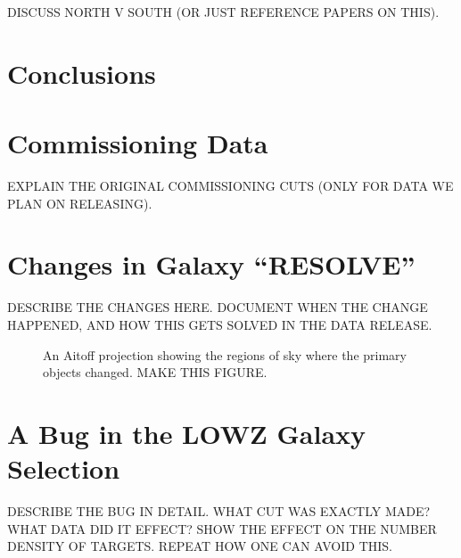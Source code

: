 \documentclass[iop,apj]{emulateapj}
\begin{document}
DISCUSS NORTH V SOUTH (OR JUST REFERENCE PAPERS ON THIS).

\section{Conclusions}


\appendix

\section{Commissioning Data}

EXPLAIN THE ORIGINAL COMMISSIONING CUTS (ONLY FOR DATA WE PLAN ON RELEASING). 


\section{Changes in Galaxy ``RESOLVE''}

DESCRIBE THE CHANGES HERE. DOCUMENT WHEN THE CHANGE HAPPENED, AND HOW THIS 
GETS SOLVED IN THE DATA RELEASE.

\begin{figure}
\caption{An Aitoff projection showing the regions of sky where the primary
objects changed. MAKE THIS FIGURE.}
\end{figure}

\section{A Bug in the LOWZ Galaxy Selection}

DESCRIBE THE BUG IN DETAIL. WHAT CUT WAS EXACTLY MADE? WHAT DATA DID IT EFFECT?
SHOW THE EFFECT ON THE NUMBER DENSITY OF TARGETS. REPEAT HOW ONE CAN AVOID THIS.
\end{document}
